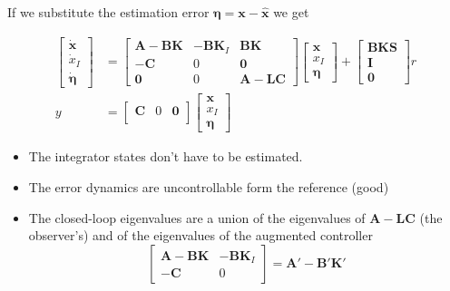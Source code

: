 If we substitute the estimation error $\bm{\eta}=\textbf{x}-\hat{\textbf{x}}$ we get

\begin{align*}
    \begin{bmatrix}
        \dot{\mathbf{x}}   \\
        \dot{x}_I \\
        \dot{\bm{\eta}}
    \end{bmatrix}
      & =
    \begin{bmatrix}
        \mathbf{A-BK} & \mathbf{-BK}_I & \mathbf{BK}  \\
        \mathbf{-C}   & 0              & \mathbf{0}             \\
        \mathbf{0}             & 0              & \mathbf{A-LC}
    \end{bmatrix}
    \begin{bmatrix}
        \mathbf{x}   \\
        x_I \\
        \bm{\eta}
    \end{bmatrix}
    +
    \begin{bmatrix}
        \mathbf{BKS} \\
        \mathbf{I}   \\
        \mathbf{0}
    \end{bmatrix}
    r                           \\
    y & = \begin{bmatrix}
              \mathbf{C} & 0 & \mathbf{0} \\
          \end{bmatrix}
    \begin{bmatrix}
        \mathbf{x}   \\
        x_I \\
        \bm{\eta}
    \end{bmatrix}
\end{align*}

\newpar{}
\begin{itemize}
    \item The integrator states don't have to be estimated.
    \item The error dynamics are uncontrollable form the reference (good)
    \item The closed-loop eigenvalues are a union of the eigenvalues of $\mathbf{A-LC}$ (the observer's) and of the eigenvalues of the augmented controller \begin{equation*}
              \begin{bmatrix}
                  \mathbf{A-BK} & \mathbf{-BK}_I \\
                  \mathbf{-C}   & 0
              \end{bmatrix}
              = \mathbf{A'-B'K'}
          \end{equation*}
\end{itemize}

